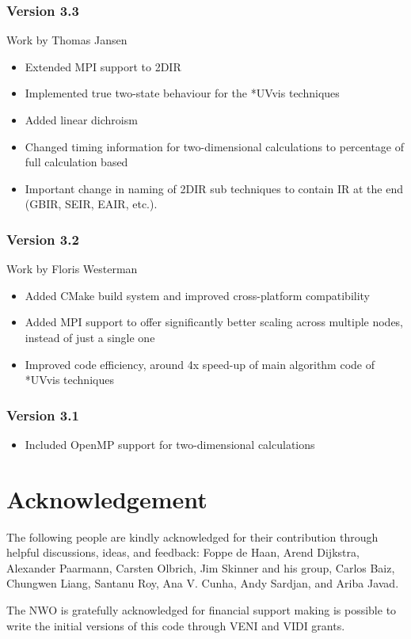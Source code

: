 \documentclass[12pt]{book}
\begin{document}
\subsection{Version 3.3}
{\small Work by Thomas Jansen}
\begin{itemize}
\item Extended MPI support to 2DIR
\item Implemented true two-state behaviour for the *UVvis techniques
\item Added linear dichroism
\item Changed timing information for two-dimensional calculations to percentage of full calculation based
\item Important change in naming of 2DIR sub techniques to contain IR at the end (GBIR, SEIR, EAIR, etc.).
\end{itemize}
	\subsection{Version 3.2}
{\small Work by Floris Westerman}
\begin{itemize}
\item Added CMake build system and improved cross-platform compatibility
\item Added MPI support to offer significantly better scaling across multiple nodes, instead of just a single one
\item Improved code efficiency, around 4x speed-up of main algorithm code of *UVvis techniques
\end{itemize}

\subsection{Version 3.1}
\begin{itemize}
\item Included OpenMP support for two-dimensional calculations
\end{itemize}









\chapter{Acknowledgement}
The following people are kindly acknowledged for their contribution through helpful discussions, ideas, and feedback:
Foppe de Haan, Arend Dijkstra, Alexander Paarmann, Carsten Olbrich, Jim Skinner and his group, Carlos Baiz, Chungwen Liang, Santanu Roy, Ana V. Cunha, Andy Sardjan, and Ariba Javad. 

The NWO is gratefully acknowledged
for financial support making is possible to write the initial versions of this code through VENI and VIDI grants. 

\end{document}
